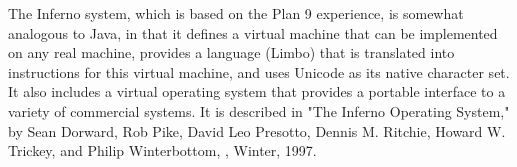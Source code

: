 The Inferno system, which is based on the Plan 9 experience, is somewhat
analogous to Java, in that it defines a virtual machine that can be
implemented on any real machine, provides a language (Limbo) that is
translated into instructions for this virtual machine, and uses Unicode as
its native character set. It also includes a virtual operating system that
provides a portable interface to a variety of commercial systems. It is
described in "The Inferno Operating System," by Sean Dorward, Rob Pike,
David Leo Presotto, Dennis M. Ritchie, Howard W. Trickey, and Philip
Winterbottom, , Winter, 1997.
